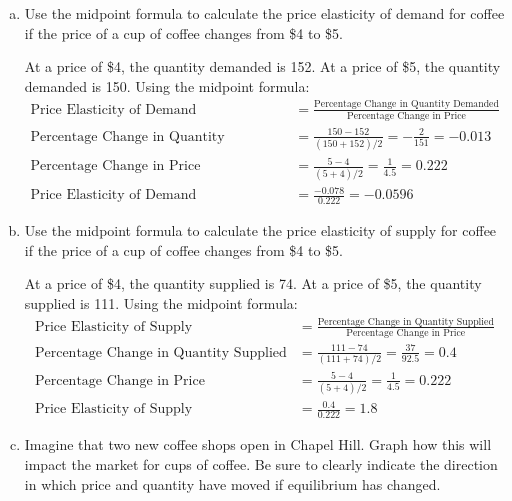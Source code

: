 \documentclass{article}
\begin{document}
\begin{enumerate}[(a)]
    \pagebreak
    \item Use the midpoint formula to calculate the price elasticity of demand for coffee if the price of a cup of coffee changes from \$4 to \$5.
    
    At a price of \$4, the quantity demanded is 152. At a price of \$5, the quantity demanded is 150. Using the midpoint formula:
    \begin{align*}
        \text{Price Elasticity of Demand} &= \frac{\text{Percentage Change in Quantity Demanded}}{\text{Percentage Change in Price}}\\
        \text{Percentage Change in Quantity Demanded} &= \frac{150 - 152}{(150+152)/2} = -\frac{2}{151} = -0.013\\
        \text{Percentage Change in Price} &= \frac{5 - 4}{(5 + 4)/2} = \frac{1}{4.5} = 0.222\\
        \text{Price Elasticity of Demand} &= \frac{-0.078}{0.222} = -0.0596
    \end{align*}
    \item Use the midpoint formula to calculate the price elasticity of supply for coffee if the price of a cup of coffee changes from \$4 to \$5.
    
    At a price of \$4, the quantity supplied is 74. At a price of \$5, the quantity supplied is 111. Using the midpoint formula:
    \begin{align*}
        \text{Price Elasticity of Supply} &= \frac{\text{Percentage Change in Quantity Supplied}}{\text{Percentage Change in Price}}\\
        \text{Percentage Change in Quantity Supplied} &= \frac{111 - 74}{(111+74)/2} = \frac{37}{92.5} = 0.4\\
        \text{Percentage Change in Price} &= \frac{5 - 4}{(5 + 4)/2} = \frac{1}{4.5} = 0.222\\
        \text{Price Elasticity of Supply} &= \frac{0.4}{0.222} = 1.8
    \end{align*}
    \item Imagine that two new coffee shops open in Chapel Hill. Graph how this will impact the market for cups of coffee. Be sure to clearly indicate the direction in which price and quantity have moved if equilibrium has changed.
    

\end{enumerate}
\end{document}
